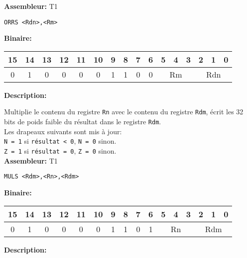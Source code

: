 \textbf{Assembleur:} T1

\begin{lstlisting}
ORRS <Rdn>,<Rm>
\end{lstlisting}

\textbf{Binaire:}\\

\begin{tabular}{| c c c c c c c c c c c c c c c c |}
\hline
15 & 14 & 13 & 12 & 11 & 10 & \multicolumn{1}{|c}{9} & 8 & 7 & 6 & \multicolumn{1}{|c}{5} & 4 & 3 & \multicolumn{1}{|c}{2} & 1 & 0 \\
\hline
0 & 1 & 0 & 0 & 0 & 0 & \multicolumn{1}{|c}{1} & 1 & 0 & 0 & \multicolumn{3}{|c}{Rm} & \multicolumn{3}{|c|}{Rdn} \\
\hline
\end{tabular}



\textbf{Description: }

Multiplie le contenu du registre \texttt{Rn} avec le contenu du registre \texttt{Rdm}, écrit les 32 bits de poids faible du résultat dans le registre \texttt{Rdm}.\\
Les drapeaux suivants sont mis à jour:\\
\texttt{N = 1} si \texttt{résultat < 0}, \texttt{N = 0} sinon.\\
\texttt{Z = 1} si \texttt{résultat = 0}, \texttt{Z = 0} sinon.\\

\textbf{Assembleur:} T1

\begin{lstlisting}
MULS <Rdm>,<Rn>,<Rdm>
\end{lstlisting}

\textbf{Binaire:}\\

\begin{tabular}{| c c c c c c c c c c c c c c c c |}
\hline
15 & 14 & 13 & 12 & 11 & 10 & \multicolumn{1}{|c}{9} & 8 & 7 & 6 & \multicolumn{1}{|c}{5} & 4 & 3 & \multicolumn{1}{|c}{2} & 1 & 0 \\
\hline
0 & 1 & 0 & 0 & 0 & 0 & \multicolumn{1}{|c}{1} & 1 & 0 & 1 & \multicolumn{3}{|c}{Rn} & \multicolumn{3}{|c|}{Rdm} \\
\hline
\end{tabular}



\textbf{Description: }

